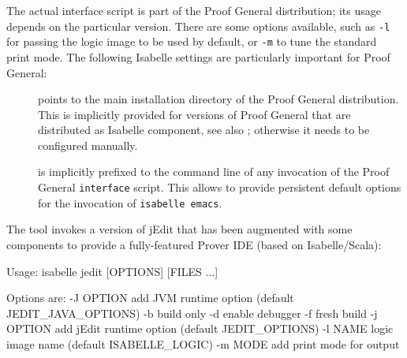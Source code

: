 \begin{isabellebody}
\begin{isamarkuptext}
  The actual interface script is part of the Proof General
  distribution; its usage depends on the particular version.  There
  are some options available, such as \verb|-l| for passing the
  logic image to be used by default, or \verb|-m| to tune the
  standard print mode.  The following Isabelle settings are
  particularly important for Proof General:

  \begin{description}

  \item[\hypertarget{setting.PROOFGENERAL-HOME}{\hyperlink{setting.PROOFGENERAL-HOME}{\mbox{}}}] points to the main
  installation directory of the Proof General distribution.  This is
  implicitly provided for versions of Proof General that are
  distributed as Isabelle component, see also ;
  otherwise it needs to be configured manually.

  \item[\hypertarget{setting.PROOFGENERAL-OPTIONS}{\hyperlink{setting.PROOFGENERAL-OPTIONS}{\mbox{}}}] is implicitly prefixed to
  the command line of any invocation of the Proof General \verb|interface| script.  This allows to provide persistent default
  options for the invocation of \texttt{isabelle emacs}.

  \end{description}%
\end{isamarkuptext}%
\isamarkuptrue%
%
\isamarkuptrue%
%
\begin{isamarkuptext}%
The \hypertarget{tool.jedit}{\hyperlink{tool.jedit}{\mbox{}}} tool invokes a version of jEdit that has
  been augmented with some components to provide a fully-featured
  Prover IDE (based on Isabelle/Scala):
\begin{ttbox}
Usage: isabelle jedit [OPTIONS] [FILES ...]

  Options are:
    -J OPTION    add JVM runtime option (default JEDIT_JAVA_OPTIONS)
    -b           build only
    -d           enable debugger
    -f           fresh build
    -j OPTION    add jEdit runtime option (default JEDIT_OPTIONS)
    -l NAME      logic image name (default ISABELLE_LOGIC)
    -m MODE      add print mode for output


\end{ttbox}
\end{isamarkuptext}
\end{isabellebody}
